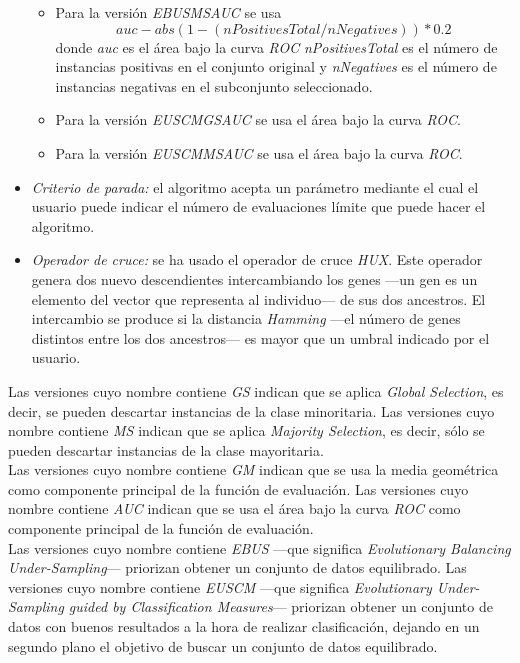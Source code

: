 \begin{itemize}
\begin{itemize}
		\item Para la versión \textit{EBUSMSAUC} se usa
		\begin{equation}
			auc - abs(1 - (nPositivesTotal / nNegatives)) * 0.2
		\end{equation}
		donde \textit{auc} es el área bajo la curva \textit{ROC} \textit{nPositivesTotal} es el número de instancias positivas en el conjunto original y \textit{nNegatives} es el número de instancias negativas en el subconjunto seleccionado.
		\item Para la versión \textit{EUSCMGSAUC} se usa el área bajo la curva \textit{ROC}.
		\item Para la versión \textit{EUSCMMSAUC} se usa el área bajo la curva \textit{ROC}.
	\end{itemize}
	\item \textit{Criterio de parada:} el algoritmo acepta un parámetro mediante el cual el usuario puede indicar el número de evaluaciones límite que puede hacer el algoritmo.
	\item \textit{Operador de cruce:} se ha usado el operador de cruce \textit{HUX}. Este operador genera dos nuevo descendientes intercambiando los genes —un gen es un elemento del vector que representa al individuo— de sus dos ancestros. El intercambio se produce si la distancia \textit{Hamming} —el número de genes distintos entre los dos ancestros— es mayor que un umbral indicado por el usuario.
\end{itemize}

Las versiones cuyo nombre contiene \textit{GS} indican que se aplica \textit{Global Selection}, es decir, se pueden descartar instancias de la clase minoritaria. Las versiones cuyo nombre contiene \textit{MS} indican que se aplica \textit{Majority Selection}, es decir, sólo se pueden descartar instancias de la clase mayoritaria. \\

Las versiones cuyo nombre contiene \textit{GM} indican que se usa la media geométrica como componente principal de la función de evaluación. Las versiones cuyo nombre contiene \textit{AUC} indican que se usa el área bajo la curva \textit{ROC} como componente principal de la función de evaluación. \\

Las versiones cuyo nombre contiene \textit{EBUS} —que significa \textit{Evolutionary Balancing Under-Sampling}— priorizan obtener un conjunto de datos equilibrado. Las versiones cuyo nombre contiene \textit{EUSCM} —que significa \textit{Evolutionary Under-Sampling guided by Classification Measures}— priorizan obtener un conjunto de datos con buenos resultados a la hora de realizar clasificación, dejando en un segundo plano el objetivo de buscar un conjunto de datos equilibrado.


